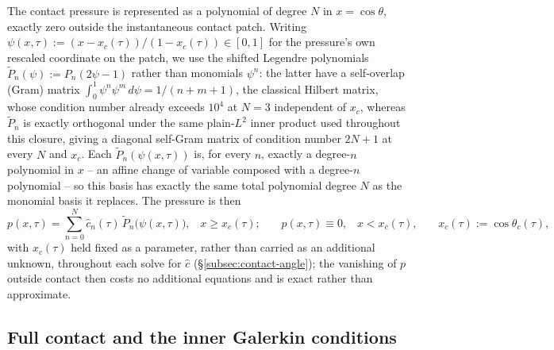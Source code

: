 The contact pressure is represented as a polynomial of degree $N$ in $x=\cos\theta$, exactly zero outside the instantaneous contact patch. Writing $\psi(x,\tau):=(x-x_c(\tau))/(1-x_c(\tau))\in[0,1]$ for the pressure's own rescaled coordinate on the patch, we use the shifted Legendre polynomials $\tilde P_n(\psi):=P_n(2\psi-1)$ rather than monomials $\psi^n$: the latter have a self-overlap (Gram) matrix $\int_0^1\psi^n\psi^m\,d\psi=1/(n+m+1)$, the classical Hilbert matrix, whose condition number already exceeds $10^4$ at $N=3$ independent of $x_c$, whereas $\tilde P_n$ is exactly orthogonal under the same plain-$L^2$ inner product used throughout this closure, giving a diagonal self-Gram matrix of condition number $2N+1$ at every $N$ and $x_c$. Each $\tilde P_n(\psi(x,\tau))$ is, for every $n$, exactly a degree-$n$ polynomial in $x$ -- an affine change of variable composed with a degree-$n$ polynomial -- so this basis has exactly the same total polynomial degree $N$ as the monomial basis it replaces. The pressure is then
\begin{equation}
    p(x,\tau) = \sum_{n=0}^{N} \hat c_n(\tau)\, \tilde P_n\big(\psi(x,\tau)\big)\text{,}\quad x\ge x_c(\tau)\text{;}\qquad
    p(x,\tau) \equiv 0\text{,}\quad x<x_c(\tau)\text{,}\qquad x_c(\tau):=\cos\theta_c(\tau)\text{,}
    \label{eq:pressure-poly}
\end{equation}
with $x_c(\tau)$ held fixed as a parameter, rather than carried as an additional unknown, throughout each solve for $\hat c$ (\S\ref{subsec:contact-angle}); the vanishing of $p$ outside contact then costs no additional equations and is exact rather than approximate.

\subsection{Full contact and the inner Galerkin conditions}
\label{subsec:full-contact}

